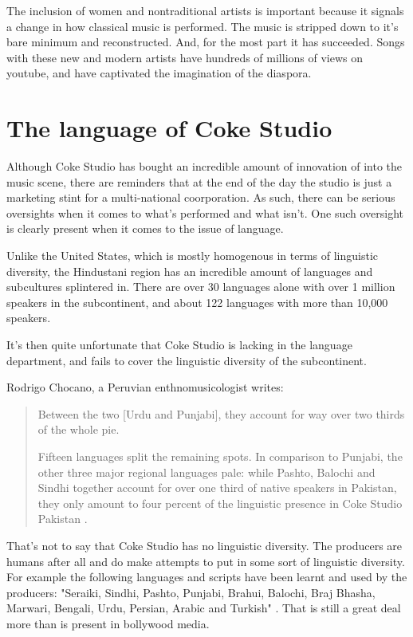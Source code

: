 \documentclass{article}
\begin{document}
The inclusion of women and nontraditional artists is important because it
signals a change in how classical music is performed. The music is stripped down
to it's bare minimum and reconstructed. And, for the most part it has succeeded.
Songs with these new and modern artists have hundreds of millions of views on
youtube, and have captivated the imagination of the diaspora. 

\section{The language of Coke Studio}

Although Coke Studio has bought an incredible amount of innovation of into the
music scene, there are reminders that at the end of the day the studio is just a
marketing stint for a multi-national coorporation. As such, there can be serious
oversights when it comes to what's performed and what isn't. One such oversight is 
clearly present when it comes to the issue of language. 

Unlike the United States, which is mostly homogenous in terms of linguistic
diversity, the Hindustani region has an incredible amount of languages and
subcultures splintered in.  There are over 30 languages alone with over 1
million speakers in the subcontinent, and about 122 languages with more than
10,000 speakers.

It's then quite unfortunate that Coke Studio is lacking in the language
department, and fails to cover the linguistic diversity of the subcontinent. 

Rodrigo Chocano, a Peruvian enthnomusicologist writes: 

\begin{quote}
  Between the two [Urdu and Punjabi], they account for way over two thirds of the whole pie.

  Fifteen languages split the remaining spots. In comparison to Punjabi, the other
  three major regional languages pale: while Pashto, Balochi and Sindhi together
  account for over one third of native speakers in Pakistan, they only amount to
  four percent of the linguistic presence in Coke Studio Pakistan \autocite{soundscape}.
\end{quote}


That's not to say that Coke Studio has no linguistic diversity. The producers
are humans after all and do make attempts to put in some sort of linguistic
diversity.  For example the following languages and scripts have been learnt and
used by the producers: "Seraiki, Sindhi, Pashto, Punjabi, Brahui, Balochi, Braj
Bhasha, Marwari, Bengali, Urdu, Persian, Arabic and Turkish" \autocite{herald}.
That is still a great deal more than is present in bollywood media. 
\end{document}
